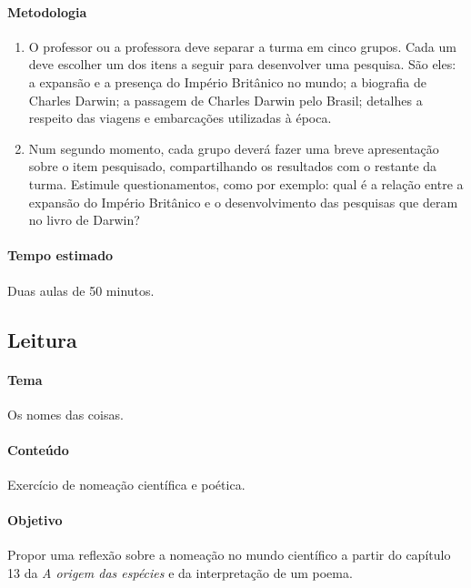 \documentclass[11pt]{extarticle}
\begin{document}
\paragraph{Metodologia}

\begin{enumerate}

	\item
	O professor ou a professora deve separar a turma em cinco grupos. Cada um deve escolher
	um dos itens a seguir para desenvolver uma pesquisa. São eles: 
	a expansão e a presença do Império Britânico no mundo; a biografia
	de Charles Darwin; a passagem de Charles Darwin pelo Brasil;
	detalhes a respeito das viagens e embarcações utilizadas à época.
	
	\item
	Num segundo momento, cada grupo deverá fazer uma breve apresentação sobre 
	o item pesquisado, compartilhando os resultados com o restante da turma.
	Estimule questionamentos, como por exemplo: qual é a relação entre
	a expansão do Império Britânico e o desenvolvimento das pesquisas
	que deram no livro de Darwin? 

\end{enumerate}

\paragraph{Tempo estimado} Duas aulas de 50 minutos.


\subsection{Leitura}

\paragraph{Tema} Os nomes das coisas.

\paragraph{Conteúdo} Exercício de nomeação científica e poética.

\paragraph{Objetivo} Propor uma reflexão sobre a nomeação no mundo científico
a partir do capítulo 13 da \emph{A origem das espécies} e da interpretação de um poema. 
\end{document}
